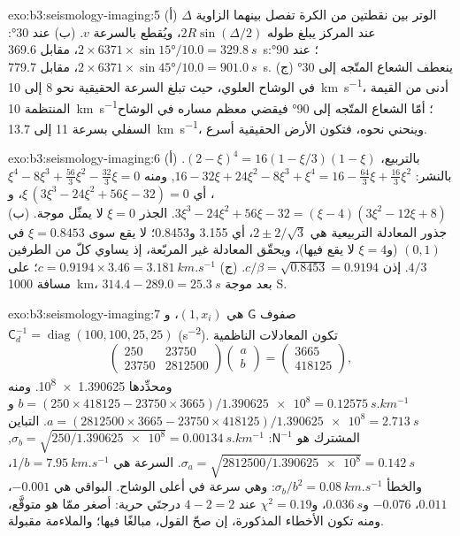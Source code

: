 \begin{solution}{exo:b3:seismology-imaging:5}
(أ) الوتر بين نقطتين من الكرة تفصل بينهما الزاوية $\Delta$
عند المركز يبلغ طوله $2R\sin(\Delta/2)$، ويُقطع بالسرعة $v$.
(ب) عند \ang{30}: $2\times6371\times\sin\ang{15}/10.0 = \qty{329.8}{s}$، مقابل
\qty{369.6}{s}؛ عند \ang{90}: $2\times6371\times\sin\ang{45}/10.0 =
\qty{901.0}{s}$، مقابل \qty{779.7}{s}. (ج) ينعطف الشعاع المتّجه إلى \ang{30} في
الوشاح العلوي، حيث تبلغ السرعة الحقيقية نحو 8 إلى \qty{10}{km.s^{-1}}، أدنى من
القيمة المنتظمة \qty{10}{km.s^{-1}}؛ أمّا الشعاع المتّجه إلى \ang{90} فيقضي معظم مساره في
الوشاح السفلي بسرعة 11 إلى \qty{13.7}{km.s^{-1}}، وينحني نحوه، فتكون
الأرض الحقيقية أسرع.
\end{solution}

\begin{solution}{exo:b3:seismology-imaging:6}
(أ) بالتربيع، $(2 - \xi)^4 = 16(1 - \xi/3)(1 - \xi)$. بالنشر:
$16 - 32\xi + 24\xi^2 - 8\xi^3 + \xi^4 = 16 - \tfrac{64}{3}\xi + \tfrac{16}{3}\xi^2$,
ومنه $\xi^4 - 8\xi^3 + \tfrac{56}{3}\xi^2 - \tfrac{32}{3}\xi = 0$، أي
$\xi\,(3\xi^3 - 24\xi^2 + 56\xi - 32) = 0$،
و$3\xi^3 - 24\xi^2 + 56\xi - 32 = (\xi - 4)(3\xi^2 - 12\xi + 8)$. الجذر
$\xi = 0$ لا يمثّل موجة. (ب) جذور المعادلة التربيعية هي $2 \pm 2/\sqrt3$،
أي 3.155 و0.8453؛ لا يقع سوى $\xi = 0.8453$ في $(0, 1)$ (و$\xi = 4$
لا يقع فيها)، ويحقّق المعادلة غير المربّعة، إذ يساوي كلّ من الطرفين $4/3$.
إذن $c/\beta = \sqrt{0.8453} = 0.9194$. (ج) $c = 0.9194\times3.46 =
\qty{3.181}{km.s^{-1}}$؛ على مسافة \qty{1000}{km}، $314.4 - 289.0 = \qty{25.3}{s}$
بعد موجة S.
\end{solution}

\begin{solution}{exo:b3:seismology-imaging:7}
صفوف $\mathsf G$ هي $(1, x_i)$، و$\mathsf C_d^{-1} = \operatorname{diag}
(100, 100, 25, 25)$ (\unit{s^{-2}}). تكون المعادلات الناظمية
\[
  \begin{pmatrix} 250 & 23750 \\ 23750 & \num{2812500} \end{pmatrix}
  \begin{pmatrix} a \\ b \end{pmatrix}
  = \begin{pmatrix} 3665 \\ 418125 \end{pmatrix},
\]
ومحدِّدها \num{1.390625e8}. ومنه $b = (250\times418125 -
23750\times3665)/\num{1.390625e8} = \qty{0.12575}{s.km^{-1}}$
و$a = (2812500\times3665 - 23750\times418125)/\num{1.390625e8} =
\qty{2.713}{s}$. التباين المشترك هو $\mathsf N^{-1}$: $\sigma_b =
\sqrt{250/\num{1.390625e8}} = \qty{0.00134}{s.km^{-1}}$, $\sigma_a =
\sqrt{2812500/\num{1.390625e8}} = \qty{0.142}{s}$. السرعة هي
$1/b = \qty{7.95}{km.s^{-1}}$، والخطأ $\sigma_b/b^2 =
\qty{0.08}{km.s^{-1}}$: وهي سرعة في أعلى الوشاح. البواقي هي $-0.001$،
$0.011$، $-0.076$ و$\qty{0.036}{s}$، و$\chi^2 = 0.19$ عند $4 - 2 = 2$
درجتَي حرية: أصغر ممّا هو متوقَّع، ومنه تكون الأخطاء المذكورة، إن صحّ القول،
مبالغًا فيها؛ والملاءمة مقبولة.
\end{solution}


